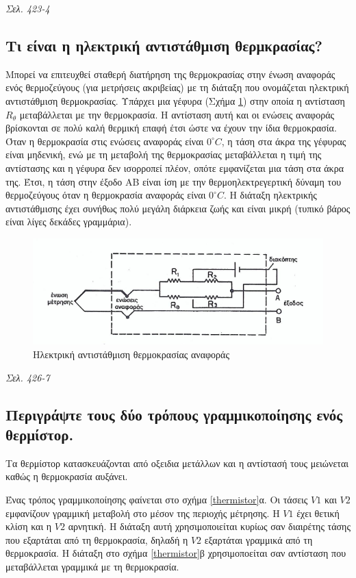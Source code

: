 \documentclass{article}
\begin{document}
\emph{Σελ. 423-4}

\subsection{Τι είναι η ηλεκτρική αντιστάθμιση θερμκρασίας?}
Μπορεί να επιτευχθεί σταθερή διατήρηση της θερμοκρασίας στην ένωση αναφοράς ενός θερμοζεύγους (για μετρήσεις ακριβείας) με τη διάταξη που ονομάζεται ηλεκτρική αντιστάθμιση
θερμοκρασίας. Υπάρχει μια γέφυρα (Σχήμα \ref{antistathmisithermokrasias}) στην οποία η αντίσταση $R_\theta$ μεταβάλλεται με την θερμοκρασία. Η αντίσταση αυτή και οι ενώσεις αναφοράς βρίσκονται σε πολύ
καλή θερμική επαφή έτσι ώστε να έχουν την ίδια θερμοκρασία. Όταν η θερμοκρασία στις ενώσεις αναφοράς είναι $0^\circ C$, η τάση στα άκρα της γέφυρας είναι μηδενική, ενώ
με τη μεταβολή της θερμοκρασίας μεταβάλλεται η τιμή της αντίστασης και η γέφυρα δεν ισορροπεί πλέον, οπότε εμφανίζεται μια τάση στα άκρα της. Έτσι, η τάση στην έξοδο ΑΒ
είναι ίση με την θερμοηλεκτρεγερτική δύναμη του θερμοζεύγους όταν η θερμοκρασία αναφοράς είναι $0^\circ C$. Η διάταξη ηλεκτρικής αντιστάθμισης έχει συνήθως πολύ μεγάλη
διάρκεια ζωής και είναι μικρή (τυπικό βάρος είναι λίγες δεκάδες γραμμάρια).

\begin{figure}[h!]
    \includegraphics[width=\linewidth]{antistathmisithermokrasias.png}
    \caption{Ηλεκτρική αντιστάθμιση θερμοκρασίας αναφοράς}
    \label{antistathmisithermokrasias}
\end{figure}

\emph{Σελ. 426-7}
\subsection{Περιγράψτε τους δύο τρόπους γραμμικοποίησης ενός θερμίστορ.}
Τα θερμίστορ κατασκευάζονται από οξειδια μετάλλων και η αντίστασή τους μειώνεται καθώς η θερμοκρασία αυξάνει. 

Ένας τρόπος γραμμικοποίησης φαίνεται στο σχήμα \ref{thermistor}α. Οι τάσεις $V1$ και $V2$ εμφανίζουν γραμμική μεταβολή στο μέσον της περιοχής μέτρησης. Η $V1$ έχει 
θετική κλίση και η $V2$ αρνητική. Η διάταξη αυτή χρησιμοποιείται κυρίως σαν διαιρέτης τάσης που εξαρτάται από τη θερμοκρασία, δηλαδή η $V2$ εξαρτάται γραμμικά από 
τη θερμοκρασία. Η διάταξη στο σχήμα \ref{thermistor}β χρησιμοποείται σαν αντίσταση που μεταβάλλεται γραμμικά με τη θερμοκρασία.
\end{document}
